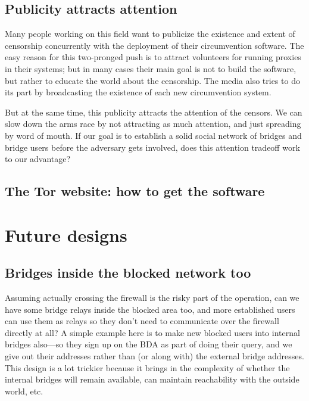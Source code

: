 \documentclass{llncs}
\begin{document}
\subsection{Publicity attracts attention}
\label{subsec:publicity}

Many people working on this field want to publicize the existence
and extent of censorship concurrently with the deployment of their
circumvention software. The easy reason for this two-pronged push is
to attract volunteers for running proxies in their systems; but in many
cases their main goal is not to build the software, but rather to educate
the world about the censorship. The media also tries to do its part by
broadcasting the existence of each new circumvention system.

But at the same time, this publicity attracts the attention of the
censors. We can slow down the arms race by not attracting as much
attention, and just spreading by word of mouth. If our goal is to
establish a solid social network of bridges and bridge users before
the adversary gets involved, does this attention tradeoff work to our
advantage?

\subsection{The Tor website: how to get the software}



\section{Future designs}

\subsection{Bridges inside the blocked network too}

Assuming actually crossing the firewall is the risky part of the
operation, can we have some bridge relays inside the blocked area too,
and more established users can use them as relays so they don't need to
communicate over the firewall directly at all? A simple example here is
to make new blocked users into internal bridges also---so they sign up
on the BDA as part of doing their query, and we give out their addresses
rather than (or along with) the external bridge addresses. This design
is a lot trickier because it brings in the complexity of whether the
internal bridges will remain available, can maintain reachability with
the outside world, etc.
\end{document}

